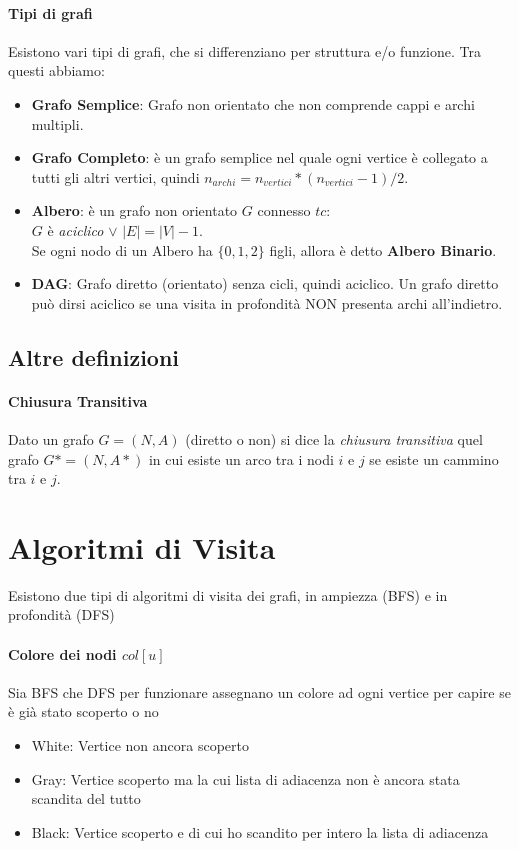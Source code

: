 \documentclass[12pt, a4paper, openany]{book}
\begin{document}
\paragraph{Tipi di grafi} Esistono vari tipi di grafi, che si differenziano per struttura e/o funzione.
Tra questi abbiamo:
\begin{itemize}
	\item \textbf{Grafo Semplice}: Grafo non orientato che non comprende cappi e archi multipli.
	\item \textbf{Grafo Completo}: è un grafo semplice nel quale ogni vertice è collegato a tutti gli altri vertici, quindi $n_{archi} = n_{vertici} * (n_{vertici} - 1)/2$.
	\item \textbf{Albero}: è un grafo non orientato $G$ connesso $tc$:
		\\$G$ è \emph{aciclico} $\vee$ $|E| = |V| - 1$.
		\\Se ogni nodo di un Albero ha  $\{0,1,2\}$ figli, allora è detto \textbf{Albero Binario}.
	\item \textbf{DAG}: Grafo diretto (orientato) senza cicli, quindi aciclico.
			Un grafo diretto può dirsi aciclico se una visita in profondità NON presenta archi all'indietro.
\end{itemize}

\subsection*{Altre definizioni}
\paragraph{Chiusura Transitiva}
Dato un grafo $G=(N,A)$ (diretto o non) si dice la \emph{chiusura transitiva} quel grafo $G*=(N,A*)$ in cui esiste un arco tra i nodi $i$ e $j$ se esiste un cammino tra $i$ e $j$.
\section{Algoritmi di Visita}
Esistono due tipi di algoritmi di visita dei grafi, in ampiezza (BFS) e in profondità (DFS)

\paragraph{Colore dei nodi $col[u]$}
Sia BFS che DFS per funzionare assegnano un colore ad ogni vertice per capire se è già stato scoperto o no
\begin{itemize}
	\item White: Vertice non ancora scoperto
	\item Gray: Vertice scoperto ma la cui lista di adiacenza non è ancora stata scandita del tutto
	\item Black: Vertice scoperto e di cui ho scandito per intero la lista di adiacenza
\end{itemize}
\end{document}
